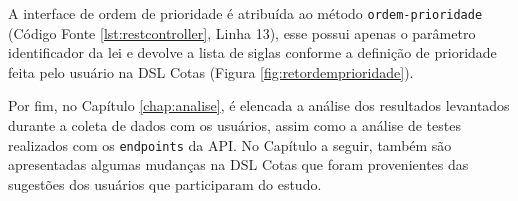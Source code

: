 \newpage
A interface de ordem de prioridade é atribuída ao método \texttt{ordem-prioridade} (Código Fonte \ref{lst:restcontroller}, Linha 13), esse possui apenas o parâmetro identificador da lei e devolve a lista de siglas conforme a definição de prioridade feita pelo usuário na DSL Cotas (Figura \ref{fig:retordemprioridade}).



\newpage
Por fim, no Capítulo \ref{chap:analise}, é elencada a análise dos resultados levantados durante a coleta de dados com os usuários, assim como a análise de testes realizados com os \texttt{endpoints} da API. No Capítulo a seguir, também são apresentadas algumas mudanças na DSL Cotas que foram provenientes das sugestões dos usuários que participaram do estudo.